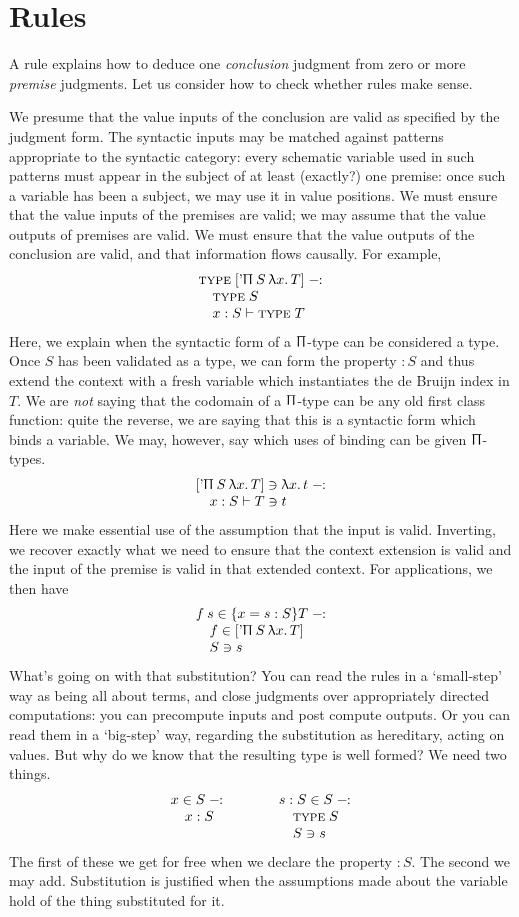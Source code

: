 \documentclass{article}
\begin{document}
\section{Rules}

A rule explains how to deduce one \emph{conclusion} judgment from zero or more \emph{premise} judgments. Let us consider how to check whether rules make sense.

We presume that the value inputs of the conclusion are valid as specified by the judgment form. The syntactic inputs may be matched against patterns appropriate to the syntactic category: every schematic variable used in such patterns must appear in the subject of at least (exactly?) one premise: once such a variable has been a subject, we may use it in value positions. We must ensure that the value inputs of the premises are valid; we may assume that the value outputs of premises are valid.
We must ensure that the value outputs of the conclusion are valid, and that information flows causally. For example,
\[
\lay{\type [\quo\Uppi\:S\:\lam x T]}
   {\type S \\ x:S\vdash \type T}
\]
Here, we explain when the syntactic form of a $\Uppi$-type can be considered a type. Once $S$ has been validated as a type, we can form the property $:S$ and thus extend the context with a fresh variable which instantiates the de Bruijn index in $T$.
We are \emph{not} saying that the codomain of a $\Uppi$-type can be any old first class function: quite the reverse, we are saying that this is a syntactic form which binds a variable. We may, however, say which uses of binding can be given $\Uppi$-types.
\[
\lay{[\quo\Uppi\:S\:\lam x T]\ni \lam x t}
   {x:S\vdash T\ni t}
\]
Here we make essential use of the assumption that the input is valid. Inverting,
we recover exactly what we need to ensure that the context extension is valid and the input of the premise is valid in that extended context.
For applications, we then have
\[
\lay{f\:s\in \{x = s:S\}T}
  {f\in [\quo\Uppi\:S\:\lam x T]\\ S\ni s}
\]
What's going on with that substitution? You can read the rules in a `small-step' way as being all about terms, and close judgments over appropriately directed computations: you can precompute inputs and post compute outputs. Or you can read them in a `big-step' way, regarding the substitution as hereditary, acting on values.
But why do we know that the resulting type is well formed? We need two things.
\[
\lay{x\in S}{x:S} \qquad\qquad
\lay{s:S\in S}{\type S\\ S\ni s}
\]
The first of these we get for free when we declare the property $:S$. The second
we may add. Substitution is justified when the assumptions made about the variable hold of the thing substituted for it.
\end{document}
